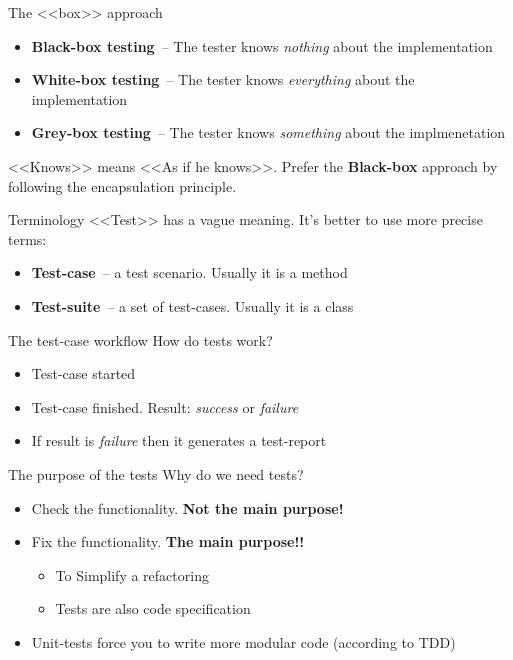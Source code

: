 \documentclass[aspectratio=169]{beamer}
\begin{document}
\begin{frame}{The <<box>> approach}
  \begin{itemize}
    \item \textbf{Black-box testing}~-- The tester knows \textit{nothing} about the implementation
    \item \textbf{White-box testing}~-- The tester knows \textit{everything} about the implementation
    \item \textbf{Grey-box testing}~-- The tester knows \textit{something} about the implmenetation
  \end{itemize}
  \bigskip
  \pause
  <<Knows>> means <<As if he knows>>.
  Prefer the \textbf{Black-box} approach by following the encapsulation principle.
\end{frame}

\begin{frame}{Terminology}
  <<Test>> has a vague meaning. It's better to use more precise terms:
  \begin{itemize}
    \item \textbf{Test-case}~-- a test scenario. Usually it is a method
    \item \textbf{Test-suite}~-- a set of test-cases. Usually it is a class
  \end{itemize}
\end{frame}

\begin{frame}{The test-case workflow}
  How do tests work?
  \begin{itemize}
    \item Test-case started
    \item Test-case finished. Result: \textit{success} or \textit{failure}
    \item If result is \textit{failure} then it generates a test-report
  \end{itemize}
\end{frame}

\begin{frame}{The purpose of the tests}
  Why do we need tests?
  \begin{itemize}
    \item Check the functionality. \textbf{Not the main purpose!}
    \item Fix the functionality. \textbf{The main purpose!!}
      \begin{itemize}
        \item To Simplify a refactoring
        \item Tests are also code specification
      \end{itemize}
    \item Unit-tests force you to write more modular code (according to TDD)
  \end{itemize}
\end{frame}
\end{document}
